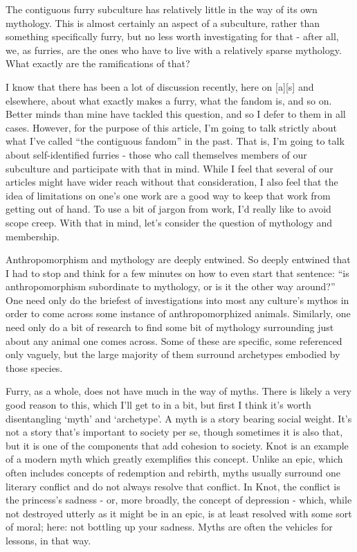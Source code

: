 The contiguous furry subculture has relatively little in the way of its own mythology. This is almost certainly an aspect of a subculture, rather than something specifically furry, but no less worth investigating for that - after all, we, as furries, are the ones who have to live with a relatively sparse mythology. What exactly are the ramifications of that?

I know that there has been a lot of discussion recently, here on {[}a{]}{[}s{]} and elsewhere, about what exactly makes a furry, what the fandom is, and so on. Better minds than mine have tackled this question, and so I defer to them in all cases. However, for the purpose of this article, I'm going to talk strictly about what I've called ``the contiguous fandom'' in the past. That is, I'm going to talk about self-identified furries - those who call themselves members of our subculture and participate with that in mind. While I feel that several of our articles might have wider reach without that consideration, I also feel that the idea of limitations on one's one work are a good way to keep that work from getting out of hand. To use a bit of jargon from work, I'd really like to avoid scope creep. With that in mind, let's consider the question of mythology and membership.

Anthropomorphism and mythology are deeply entwined. So deeply entwined that I had to stop and think for a few minutes on how to even start that sentence: ``is anthropomorphism subordinate to mythology, or is it the other way around?'' One need only do the briefest of investigations into most any culture's mythos in order to come across some instance of anthropomorphized animals. Similarly, one need only do a bit of research to find some bit of mythology surrounding just about any animal one comes across. Some of these are specific, some referenced only vaguely, but the large majority of them surround archetypes embodied by those species.

Furry, as a whole, does not have much in the way of myths. There is likely a very good reason to this, which I'll get to in a bit, but first I think it's worth disentangling `myth' and `archetype'. A myth is a story bearing social weight. It's not a story that's important to society per se, though sometimes it is also that, but it is one of the components that add cohesion to society. Knot is an example of a modern myth which greatly exemplifies this concept. Unlike an epic, which often includes concepts of redemption and rebirth, myths usually surround one literary conflict and do not always resolve that conflict. In Knot, the conflict is the princess's sadness - or, more broadly, the concept of depression - which, while not destroyed utterly as it might be in an epic, is at least resolved with some sort of moral; here: not bottling up your sadness. Myths are often the vehicles for lessons, in that way.


